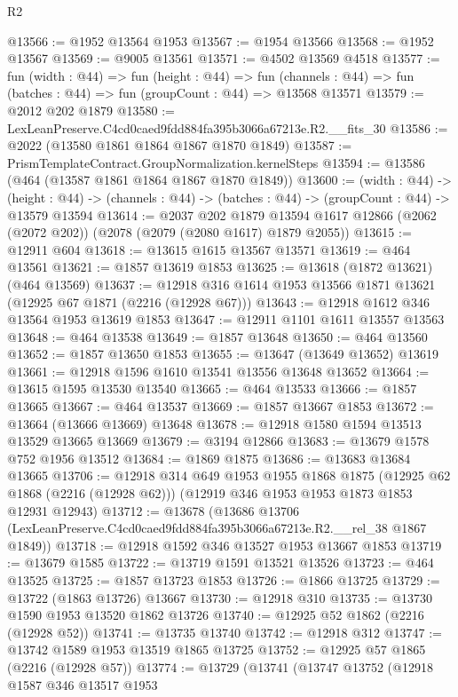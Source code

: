 \begin{lexlean}{R2}
\begin{coremodule}
@13566 := @1952 @13564 @1953
@13567 := @1954 @13566
@13568 := @1952 @13567
@13569 := @9005 @13561
@13571 := @4502 @13569 @4518
@13577 := fun (width : @44) =>
  fun (height : @44) =>
  fun (channels : @44) => fun (batches : @44) => fun (groupCount : @44) => @13568 @13571
@13579 := @2012 @202 @1879
@13580 := LexLeanPreserve.C4cd0caed9fdd884fa395b3066a67213e.R2.__fits_30
@13586 := @2022 (@13580 @1861 @1864 @1867 @1870 @1849)
@13587 := PrismTemplateContract.GroupNormalization.kernelSteps
@13594 := @13586 (@464 (@13587 @1861 @1864 @1867 @1870 @1849))
@13600 := (width : @44) ->
  (height : @44) -> (channels : @44) -> (batches : @44) -> (groupCount : @44) -> @13579 @13594
@13614 := @2037
    @202
    @1879
    @13594
    @1617
    @12866
    (@2062 (@2072 @202))
    (@2078 (@2079 (@2080 @1617) @1879 @2055))
@13615 := @12911 @604
@13618 := @13615 @1615 @13567 @13571
@13619 := @464 @13561
@13621 := @1857 @13619 @1853
@13625 := @13618 (@1872 @13621) (@464 @13569)
@13637 := @12918 @316 @1614 @1953 @13566 @1871 @13621 (@12925 @67 @1871 (@2216 (@12928 @67)))
@13643 := @12918 @1612 @346 @13564 @1953 @13619 @1853
@13647 := @12911 @1101 @1611 @13557 @13563
@13648 := @464 @13538
@13649 := @1857 @13648
@13650 := @464 @13560
@13652 := @1857 @13650 @1853
@13655 := @13647 (@13649 @13652) @13619
@13661 := @12918 @1596 @1610 @13541 @13556 @13648 @13652
@13664 := @13615 @1595 @13530 @13540
@13665 := @464 @13533
@13666 := @1857 @13665
@13667 := @464 @13537
@13669 := @1857 @13667 @1853
@13672 := @13664 (@13666 @13669) @13648
@13678 := @12918 @1580 @1594 @13513 @13529 @13665 @13669
@13679 := @3194 @12866
@13683 := @13679 @1578 @752 @1956 @13512
@13684 := @1869 @1875
@13686 := @13683 @13684 @13665
@13706 := @12918
    @314
    @649
    @1953
    @1955
    @1868
    @1875
    (@12925 @62 @1868 (@2216 (@12928 @62)))
    (@12919 @346 @1953 @1953 @1873 @1853 @12931 @12943)
@13712 := @13678
    (@13686 @13706 (LexLeanPreserve.C4cd0caed9fdd884fa395b3066a67213e.R2.__rel_38 @1867 @1849))
@13718 := @12918 @1592 @346 @13527 @1953 @13667 @1853
@13719 := @13679 @1585
@13722 := @13719 @1591 @13521 @13526
@13723 := @464 @13525
@13725 := @1857 @13723 @1853
@13726 := @1866 @13725
@13729 := @13722 (@1863 @13726) @13667
@13730 := @12918 @310
@13735 := @13730 @1590 @1953 @13520 @1862 @13726
@13740 := @12925 @52 @1862 (@2216 (@12928 @52))
@13741 := @13735 @13740
@13742 := @12918 @312
@13747 := @13742 @1589 @1953 @13519 @1865 @13725
@13752 := @12925 @57 @1865 (@2216 (@12928 @57))
@13774 := @13729
    (@13741
      (@13747
        @13752
        (@12918
          @1587
          @346
          @13517
          @1953

\end{coremodule}
\end{lexlean}
